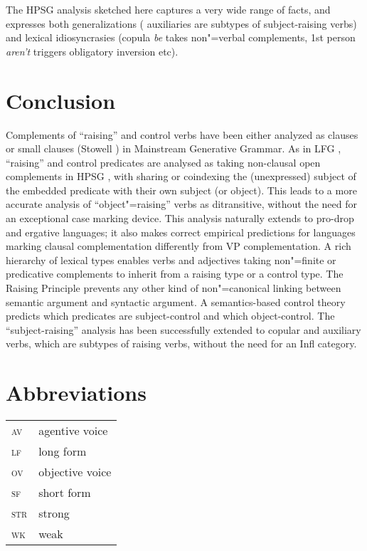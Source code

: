 \eal
{}
\zl

The HPSG analysis sketched here captures a very wide range of facts, and expresses both generalizations ( auxiliaries are subtypes of subject-raising verbs) and lexical idiosyncrasies (copula \emph{be} takes non"=verbal complements, 1st person \emph{aren't} triggers obligatory inversion etc).


	
\section{Conclusion}

Complements of ``raising'' and control verbs have been either analyzed as clauses \citep{Chomsky81a}\addpages
or small clauses (Stowell \citeyear{Stowell81a-u,Stowell1983}\addpages) in Mainstream Generative Grammar.  As in LFG
\citep{Bresnan1982}, ``raising'' and control predicates are analysed as taking non-clausal open
complements in HPSG \citep{PollardandSag1994}\addpages, with sharing or coindexing the (unexpressed) subject
of the embedded predicate with their own subject (or object). This leads to a more accurate analysis
of ``object"=raising'' verbs as ditransitive, without the need for an exceptional case marking
device. This analysis naturally extends to pro-drop and ergative languages; it also makes correct
empirical predictions for languages marking clausal complementation differently from VP
complementation. A rich hierarchy of lexical types enables verbs and adjectives taking non"=finite
or predicative complements to inherit from a raising type or a control type. The Raising Principle
prevents any other kind of non"=canonical linking between semantic argument and syntactic
argument. A semantics-based control theory predicts which predicates are subject-control and which
object-control. The ``subject-raising'' analysis has been successfully extended to copular and
auxiliary verbs, which are subtypes of raising verbs, without the need for an Infl category.



\section*{Abbreviations}

\begin{tabularx}{.45\textwidth}{@{}lX}
\textsc{av} & agentive voice\\
\textsc{lf} & long form\\ 
\textsc{ov} & objective voice\\
\textsc{sf} & short form\\
\textsc{str} & strong\\
\textsc{wk} & weak\\

\end{tabularx}

